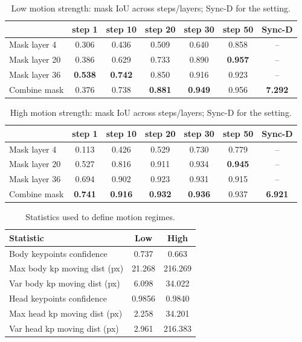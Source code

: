 \documentclass{article} %
\begin{document}
\begin{table}[h]
\centering
\caption{Low motion strength: mask IoU across steps/layers; Sync-D for the setting.}
\label{tab:mask_low}
\begin{tabular}{lccccc|c}
\toprule
 & step 1 & step 10 & step 20 & step 30 & step 50 & Sync-D \\
\midrule
Mask layer 4  & 0.306 & 0.436 & 0.509 & 0.640 & 0.858 & -- \\
Mask layer 20 & 0.386 & 0.629 & 0.733 & 0.890 & \textbf{0.957} & -- \\
Mask layer 36 & \textbf{0.538} & \textbf{0.742} & 0.850 & 0.916 & 0.923 & -- \\
Combine mask  & 0.376 & 0.738 & \textbf{0.881} & \textbf{0.949} & 0.956 & \textbf{7.292} \\
\bottomrule
\end{tabular}

\end{table}

\begin{table}[h]
\centering
\caption{High motion strength: mask IoU across steps/layers; Sync-D for the setting.}
\label{tab:mask_high}
\begin{tabular}{lccccc|c}
\toprule
 & step 1 & step 10 & step 20 & step 30 & step 50 & Sync-D \\
\midrule
Mask layer 4  & 0.113 & 0.426 & 0.529 & 0.730 & 0.779 & -- \\
Mask layer 20 & 0.527 & 0.816 & 0.911 & 0.934 & \textbf{0.945} & -- \\
Mask layer 36 & 0.694 & 0.902 & 0.923 & 0.931 & 0.915 & -- \\
Combine mask  & \textbf{0.741} & \textbf{0.916} & \textbf{0.932} & \textbf{0.936} & 0.937 & \textbf{6.921} \\
\bottomrule
\end{tabular}
\end{table}

\begin{table}[h]
\centering
\caption{Statistics used to define motion regimes.}
\label{tab:motion_stats}
\begin{tabular}{lcc}
\toprule
Statistic & Low & High \\
\midrule
Body keypoints confidence & 0.737 & 0.663 \\
Max body kp moving dist (px) & 21.268 & 216.269 \\
Var body kp moving dist (px) & 6.098 & 34.022 \\
Head keypoints confidence & 0.9856 & 0.9840 \\
Max head kp moving dist (px) & 2.258 & 34.201 \\
Var head kp moving dist (px) & 2.961 & 216.383 \\
\bottomrule
\end{tabular}
\end{table}
\end{document}
